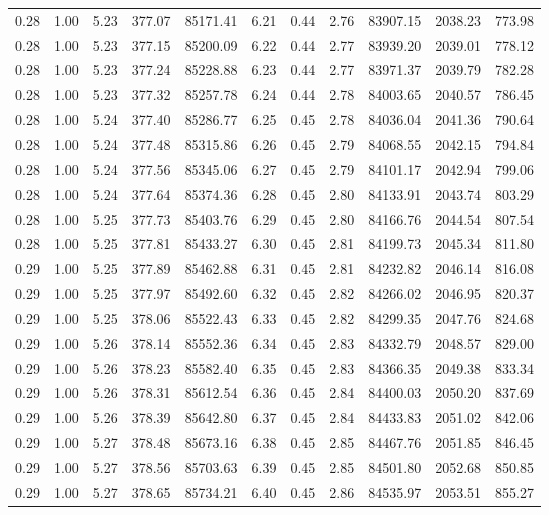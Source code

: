 \begin{table}[!ht]
\begin{tabular}{rrrrrrrrrrr}
0.28 & 1.00 & 5.23 & 377.07 & 85171.41 & 6.21 & 0.44 & 2.76 & 83907.15 & 2038.23 & 773.98 \\
0.28 & 1.00 & 5.23 & 377.15 & 85200.09 & 6.22 & 0.44 & 2.77 & 83939.20 & 2039.01 & 778.12 \\
0.28 & 1.00 & 5.23 & 377.24 & 85228.88 & 6.23 & 0.44 & 2.77 & 83971.37 & 2039.79 & 782.28 \\
0.28 & 1.00 & 5.23 & 377.32 & 85257.78 & 6.24 & 0.44 & 2.78 & 84003.65 & 2040.57 & 786.45 \\
0.28 & 1.00 & 5.24 & 377.40 & 85286.77 & 6.25 & 0.45 & 2.78 & 84036.04 & 2041.36 & 790.64 \\
0.28 & 1.00 & 5.24 & 377.48 & 85315.86 & 6.26 & 0.45 & 2.79 & 84068.55 & 2042.15 & 794.84 \\
0.28 & 1.00 & 5.24 & 377.56 & 85345.06 & 6.27 & 0.45 & 2.79 & 84101.17 & 2042.94 & 799.06 \\
0.28 & 1.00 & 5.24 & 377.64 & 85374.36 & 6.28 & 0.45 & 2.80 & 84133.91 & 2043.74 & 803.29 \\
0.28 & 1.00 & 5.25 & 377.73 & 85403.76 & 6.29 & 0.45 & 2.80 & 84166.76 & 2044.54 & 807.54 \\
0.28 & 1.00 & 5.25 & 377.81 & 85433.27 & 6.30 & 0.45 & 2.81 & 84199.73 & 2045.34 & 811.80 \\
0.29 & 1.00 & 5.25 & 377.89 & 85462.88 & 6.31 & 0.45 & 2.81 & 84232.82 & 2046.14 & 816.08 \\
0.29 & 1.00 & 5.25 & 377.97 & 85492.60 & 6.32 & 0.45 & 2.82 & 84266.02 & 2046.95 & 820.37 \\
0.29 & 1.00 & 5.25 & 378.06 & 85522.43 & 6.33 & 0.45 & 2.82 & 84299.35 & 2047.76 & 824.68 \\
0.29 & 1.00 & 5.26 & 378.14 & 85552.36 & 6.34 & 0.45 & 2.83 & 84332.79 & 2048.57 & 829.00 \\
0.29 & 1.00 & 5.26 & 378.23 & 85582.40 & 6.35 & 0.45 & 2.83 & 84366.35 & 2049.38 & 833.34 \\
0.29 & 1.00 & 5.26 & 378.31 & 85612.54 & 6.36 & 0.45 & 2.84 & 84400.03 & 2050.20 & 837.69 \\
0.29 & 1.00 & 5.26 & 378.39 & 85642.80 & 6.37 & 0.45 & 2.84 & 84433.83 & 2051.02 & 842.06 \\
0.29 & 1.00 & 5.27 & 378.48 & 85673.16 & 6.38 & 0.45 & 2.85 & 84467.76 & 2051.85 & 846.45 \\
0.29 & 1.00 & 5.27 & 378.56 & 85703.63 & 6.39 & 0.45 & 2.85 & 84501.80 & 2052.68 & 850.85 \\
0.29 & 1.00 & 5.27 & 378.65 & 85734.21 & 6.40 & 0.45 & 2.86 & 84535.97 & 2053.51 & 855.27 \\

\end{tabular}
\end{table}
